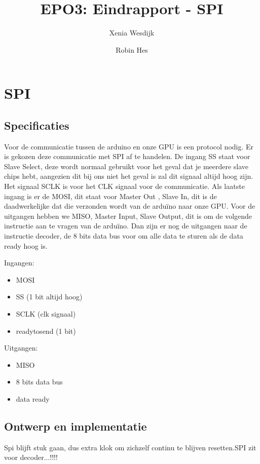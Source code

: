 \documentclass{scrartcl} %
\author{Xenia Wesdijk \and Robin Hes}
\title{EPO3: Eindrapport - SPI}
\begin{document}
\chapter{SPI}
\label{ch:spi}

\section{Specificaties}
Voor de communicatie tussen de arduino en onze GPU is een protocol nodig. Er is gekozen deze communicatie met SPI af te handelen. De ingang SS staat voor Slave Select, deze wordt normaal gebruikt voor het geval dat je meerdere slave chips hebt, aangezien dit bij ons niet het geval is zal dit signaal altijd hoog zijn. Het signaal SCLK is voor het CLK signaal voor de communicatie. Als laatste ingang is er de MOSI, dit staat voor Master Out , Slave In, dit is de daadwerkelijke dat die verzonden wordt van de arduïno naar onze GPU. Voor de uitgangen hebben we MISO, Master Input, Slave Output, dit is om de volgende instructie aan te vragen van de arduïno. Dan zijn er nog de uitgangen naar de instructie decoder, de 8 bits data bus voor om alle data te sturen als de data ready hoog is.

Ingangen: 
\begin{itemize}
	\item MOSI
	\item SS (1 bit altijd hoog)
	\item SCLK (clk signaal)
	\item readytosend (1 bit)
\end{itemize}
Uitgangen:
\begin{itemize}
	\item MISO
	\item 8 bits data bus
	\item data ready  
\end{itemize}


\section{Ontwerp en implementatie}
Spi blijft stuk gaan, dus extra klok om zichzelf continu te blijven resetten.SPI zit voor decoder...!!!!

\end{document}
